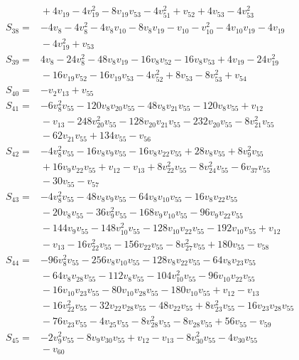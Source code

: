 \documentclass[11pt]{article}
\begin{document}
\begin{align*}
&{}+4v_{19}-4v_{19}^{2}-8v_{19}v_{53}-4v_{51}^{2}+v_{52}+4v_{53}-4v_{53}^{2}\\
S_{38}={}&-4v_{8}-4v_{8}^{2}-4v_{8}v_{10}-8v_{8}v_{19}-v_{10}-v_{10}^{2}-4v_{10}v_{19}-4v_{19}\\
&{}-4v_{19}^{2}+v_{53}\\
S_{39}={}&4v_{8}-24v_{8}^{2}-48v_{8}v_{19}-16v_{8}v_{52}-16v_{8}v_{53}+4v_{19}-24v_{19}^{2}\\
&{}-16v_{19}v_{52}-16v_{19}v_{53}-4v_{52}^{2}+8v_{53}-8v_{53}^{2}+v_{54}\\
S_{40}={}&-v_{2}v_{13}+v_{55}\\
S_{41}={}&-6v_{8}^{2}v_{55}-120v_{8}v_{20}v_{55}-48v_{8}v_{21}v_{55}-120v_{8}v_{55}+v_{12}\\
&{}-v_{13}-248v_{20}^{2}v_{55}-128v_{20}v_{21}v_{55}-232v_{20}v_{55}-8v_{21}^{2}v_{55}\\
&{}-62v_{21}v_{55}+134v_{55}-v_{56}\\
S_{42}={}&-4v_{8}^{2}v_{55}-16v_{8}v_{9}v_{55}-16v_{8}v_{22}v_{55}+28v_{8}v_{55}+8v_{9}^{2}v_{55}\\
&{}+16v_{9}v_{22}v_{55}+v_{12}-v_{13}+8v_{22}^{2}v_{55}-8v_{24}^{2}v_{55}-6v_{37}v_{55}\\
&{}-30v_{55}-v_{57}\\
S_{43}={}&-4v_{8}^{2}v_{55}-48v_{8}v_{9}v_{55}-64v_{8}v_{10}v_{55}-16v_{8}v_{22}v_{55}\\
&{}-20v_{8}v_{55}-36v_{9}^{2}v_{55}-168v_{9}v_{10}v_{55}-96v_{9}v_{22}v_{55}\\
&{}-144v_{9}v_{55}-148v_{10}^{2}v_{55}-128v_{10}v_{22}v_{55}-192v_{10}v_{55}+v_{12}\\
&{}-v_{13}-16v_{22}^{2}v_{55}-156v_{22}v_{55}-8v_{27}^{2}v_{55}+180v_{55}-v_{58}\\
S_{44}={}&-96v_{8}^{2}v_{55}-256v_{8}v_{10}v_{55}-128v_{8}v_{22}v_{55}-64v_{8}v_{23}v_{55}\\
&{}-64v_{8}v_{28}v_{55}-112v_{8}v_{55}-104v_{10}^{2}v_{55}-96v_{10}v_{22}v_{55}\\
&{}-16v_{10}v_{23}v_{55}-80v_{10}v_{28}v_{55}-180v_{10}v_{55}+v_{12}-v_{13}\\
&{}-16v_{22}^{2}v_{55}-32v_{22}v_{28}v_{55}-48v_{22}v_{55}+8v_{23}^{2}v_{55}-16v_{23}v_{28}v_{55}\\
&{}-76v_{23}v_{55}-4v_{25}v_{55}-8v_{28}^{2}v_{55}-8v_{28}v_{55}+56v_{55}-v_{59}\\
S_{45}={}&-2v_{9}^{2}v_{55}-8v_{9}v_{30}v_{55}+v_{12}-v_{13}-8v_{30}^{2}v_{55}-4v_{30}v_{55}\\
&{}-v_{60}\\

\end{align*}
\end{document}
